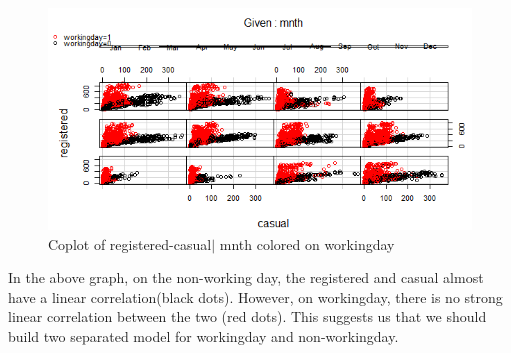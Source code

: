 \documentclass[12pt]{article}
\begin{document}
	 	\begin{figure}[H]
	 		\centering
	 		\includegraphics[scale=.9]{figures/coplot_registered_casual_mnth.png}
	 		\caption{Coplot of registered-casual$|$ mnth colored on workingday}
	 	\end{figure}
	In the above graph, on the non-working day, the registered and casual almost have a linear correlation(black dots). However, on workingday, there is no strong linear correlation between the two (red dots). This suggests us that we should build two separated model for workingday and non-workingday.
	
\end{document}
